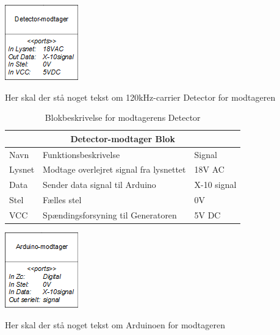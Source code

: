 \documentclass[11pt]{article}
\begin{document}
\begin{minipage}[Ht]{0.45\linewidth}
	\centering
	\includegraphics{Detector-modtager-blok.png}
\end{minipage}
\hfill
\begin{minipage}[!t]{0.45\linewidth}
	\centering
   Her skal der stå noget tekst om 120kHz-carrier Detector for modtageren
\end{minipage}%
\hfill

\begin{table}[H]
\centering
	\begin{tabular}{l|l|l}
	
	\toprule[0.4mm]\midrule \multicolumn{3}{c}{\textbf{Detector-modtager Blok}}\\
	\midrule[0.4mm] Navn & Funktionsbeskrivelse & Signal\\ \midrule[0.3mm]
	 Lysnet & Modtage overlejret signal fra lysnettet & 18V AC\\
	 Data & Sender data signal til Arduino & X-10 signal\\
	 Stel & Fælles stel  & 0V\\
	 VCC & Spændingsforsyning til Generatoren & 5V DC\\
 	 
	 \midrule\bottomrule[0.4mm]

	\end{tabular}
	\caption{Blokbeskrivelse for modtagerens Detector}
	\label{tab: Bloktabel Detector modtager}
\end{table}
\qquad

\begin{minipage}[Ht]{0.45\linewidth}
	\centering
	\includegraphics{Arduino-modtager-blok.png}
\end{minipage}
\hfill
\begin{minipage}[!t]{0.45\linewidth}
	\centering
   Her skal der stå noget tekst om Arduinoen for modtageren
\end{minipage}%
\hfill
\end{document}
